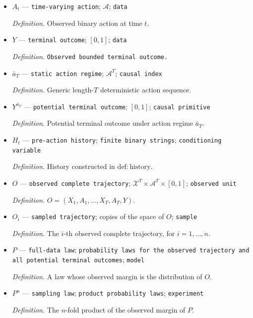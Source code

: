 \documentclass{article}
\begin{document}
\begin{itemize}
  \par\smallskip\noindent\emph{Definition.} Observed binary covariate immediately before action \(A_t\).
  \item \(A_t\) --- \texttt{time-\allowbreak{}varying action}; \(\mathcal A\); \texttt{data}
  \par\smallskip\noindent\emph{Definition.} Observed binary action at time \(t\).
  \item \(Y\) --- \texttt{terminal outcome}; \([0,1]\); \texttt{data}
  \par\smallskip\noindent\emph{Definition.} \texttt{Observed bounded terminal outcome.}
  \item \(\bar a_T\) --- \texttt{static action regime}; \(\mathcal A^T\); \texttt{causal index}
  \par\smallskip\noindent\emph{Definition.} Generic length-\(T\) deterministic action sequence.
  \item \(Y^{\bar a_T}\) --- \texttt{potential terminal outcome}; \([0,1]\); \texttt{causal primitive}
  \par\smallskip\noindent\emph{Definition.} Potential terminal outcome under action regime \(\bar a_T\).
  \item \(H_t\) --- \texttt{pre-\allowbreak{}action history}; \texttt{finite binary strings}; \texttt{conditioning variable}
  \par\smallskip\noindent\emph{Definition.} History constructed in \(\mathrm{def:history}\).
  \item \(O\) --- \texttt{observed complete trajectory}; \(\mathcal X^T\times\mathcal A^T\times[0,1]\); \texttt{observed unit}
  \par\smallskip\noindent\emph{Definition.} \(O=(X_1,A_1,\ldots,X_T,A_T,Y)\).
  \item \(O_i\) --- \texttt{sampled trajectory}; copies of the space of \(O\); \texttt{sample}
  \par\smallskip\noindent\emph{Definition.} The \(i\)-th observed complete trajectory, for \(i=1,\ldots,n\).
  \item \(P\) --- \texttt{full-\allowbreak{}data law}; \texttt{probability laws for the observed trajectory and all potential terminal outcomes}; \texttt{model}
  \par\smallskip\noindent\emph{Definition.} A law whose observed margin is the distribution of \(O\).
  \item \(P^n\) --- \texttt{sampling law}; \texttt{product probability laws}; \texttt{experiment}
  \par\smallskip\noindent\emph{Definition.} The \(n\)-fold product of the observed margin of \(P\).

\end{itemize}
\end{document}
